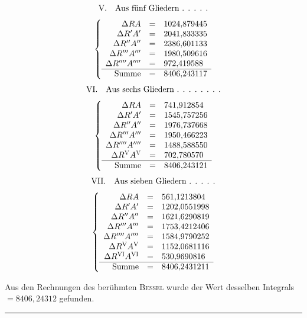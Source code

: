 \[
\begin{gathered}\mbox{V.\quad Aus fünf Gliedern . . . . .}\\[3pt]
\left\{\begin{array}{rcl}
\Delta RA&=&1024{,}879445\\
\Delta R'A'&=&2041{,}833335\\
\Delta R''A''&=&2386{,}601133\\
\Delta R'''A'''&=&1980{,}509616\\
\Delta R''''A''''&=&972{,}419588\\ \hline
\mbox{Summe}&=&8406{,}243117
\end{array}\right.\end{gathered}
\]
\[
\begin{gathered}\mbox{VI.\quad Aus sechs Gliedern . . . . . . . .}\\[3pt]
\left\{\begin{array}{rcl}
\Delta RA&=&741{,}912854\\
\Delta R'A'&=&1545{,}757256\\
\Delta R''A''&=&1976{,}737668\\
\Delta R'''A'''&=&1950{,}466223\\
\Delta R''''A''''&=&1488{,}588550\\
\Delta R^{\mathrm{V}}A^{\mathrm{V}}&=&702{,}780570\\ \hline
\mbox{Summe}&=&8406{,}243121
\end{array}\right.\end{gathered}
\]
\[
\begin{gathered}\mbox{VII.\quad Aus sieben Gliedern . . . . .}\\[3pt]
\left\{\begin{array}{rcl}
\Delta RA&=&561{,}1213804\\
\Delta R'A'&=&1202{,}0551998\\
\Delta R''A''&=&1621{,}6290819\\
\Delta R'''A'''&=&1753{,}4212406\\
\Delta R''''A''''&=&1584{,}9790252\\
\Delta R^{\mathrm{V}}A^{\mathrm{V}}&=&1152{,}0681116\\
\Delta R^{\mathrm{VI}}A^{\mathrm{VI}}&=&530{,}9690816\\ \hline
\mbox{Summe}&=&8406{,}2431211
\end{array}\right.\end{gathered}
\]

Aus den Rechnungen des berühmten \textsc{Bessel} wurde der Wert desselben Integrals $=8406{,}24312$ gefunden.

\begin{center}\rule{0.24\linewidth}{0.3pt}\end{center}
